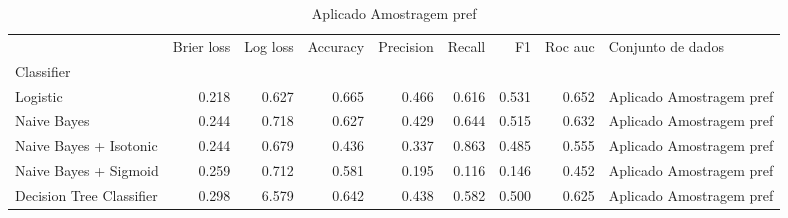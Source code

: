\begin{table}
\centering
\caption{Aplicado Amostragem pref}
\label{Aplicado Amostragem pref 2}
\begin{tabular}{lrrrrrrrl}
\toprule
{} &  Brier  loss &  Log loss &  Accuracy  &  Precision  &  Recall  &    F1  &  Roc auc  &         Conjunto de dados \\
Classifier               &              &           &            &             &          &        &           &                           \\
\midrule
Logistic                 &        0.218 &     0.627 &      0.665 &       0.466 &    0.616 &  0.531 &     0.652 &  Aplicado Amostragem pref \\
Naive Bayes              &        0.244 &     0.718 &      0.627 &       0.429 &    0.644 &  0.515 &     0.632 &  Aplicado Amostragem pref \\
Naive Bayes + Isotonic   &        0.244 &     0.679 &      0.436 &       0.337 &    0.863 &  0.485 &     0.555 &  Aplicado Amostragem pref \\
Naive Bayes + Sigmoid    &        0.259 &     0.712 &      0.581 &       0.195 &    0.116 &  0.146 &     0.452 &  Aplicado Amostragem pref \\
Decision Tree Classifier &        0.298 &     6.579 &      0.642 &       0.438 &    0.582 &  0.500 &     0.625 &  Aplicado Amostragem pref \\
\bottomrule
\end{tabular}
\end{table}
